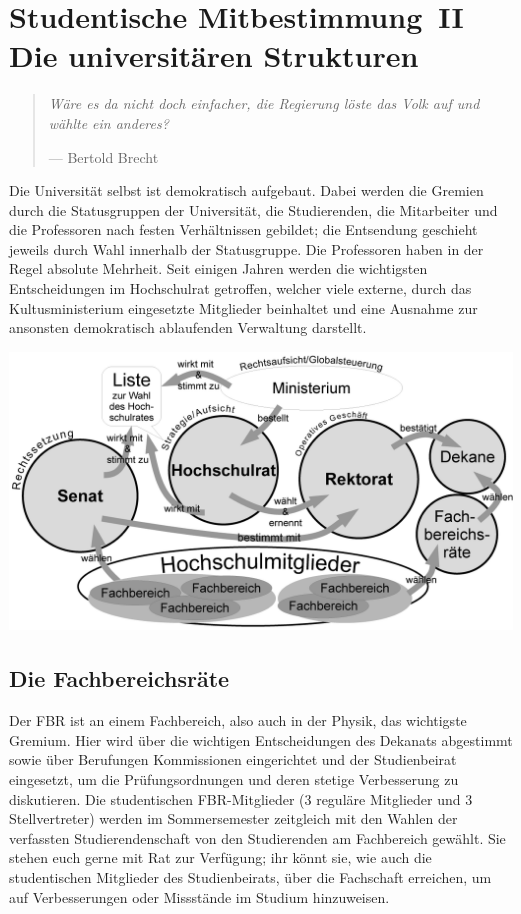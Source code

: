 \clearpage

\section*{Studentische Mitbestimmung~II\\Die universitären Strukturen}
\begin{multicols*}{2}
\begin{quote}
	\textit{Wäre es da nicht doch einfacher, die Regierung löste das Volk auf und wählte ein anderes?}
	
	\hfill--- Bertold Brecht
\end{quote}
Die Universität selbst ist demokratisch aufgebaut. Dabei werden die Gremien durch die Statusgruppen der Universität, die Studierenden, die Mitarbeiter und die Professoren nach festen Verhältnissen gebildet; die Entsendung geschieht jeweils durch Wahl innerhalb der Statusgruppe.
Die Professoren haben in der Regel absolute Mehrheit. Seit einigen Jahren werden die wichtigsten Entscheidungen im Hochschulrat getroffen, welcher viele externe, durch das Kultusministerium eingesetzte Mitglieder beinhaltet und eine Ausnahme zur ansonsten demokratisch ablaufenden Verwaltung darstellt.

\includegraphics[width=\columnwidth]{res/uni_strukturen.png}

\subsection{Die Fachbereichsräte}
Der FBR ist an einem Fachbereich, also auch in der Physik, das wichtigste Gremium.
Hier wird über die wichtigen Entscheidungen des Dekanats abgestimmt sowie über Berufungen Kommissionen eingerichtet und der Studienbeirat eingesetzt, um die Prüfungsordnungen und deren stetige Verbesserung zu diskutieren.
Die studentischen FBR-Mitglieder (3 reguläre Mitglieder und 3 Stellvertreter) werden im Sommersemester zeitgleich mit den Wahlen der verfassten Studierendenschaft von den Studierenden am Fachbereich gewählt.
Sie stehen euch gerne mit Rat zur Verfügung; ihr könnt sie, wie auch die studentischen Mitglieder des Studienbeirats, über die Fachschaft erreichen, um auf Verbesserungen oder Missstände im Studium hinzuweisen.


\end{multicols*}
